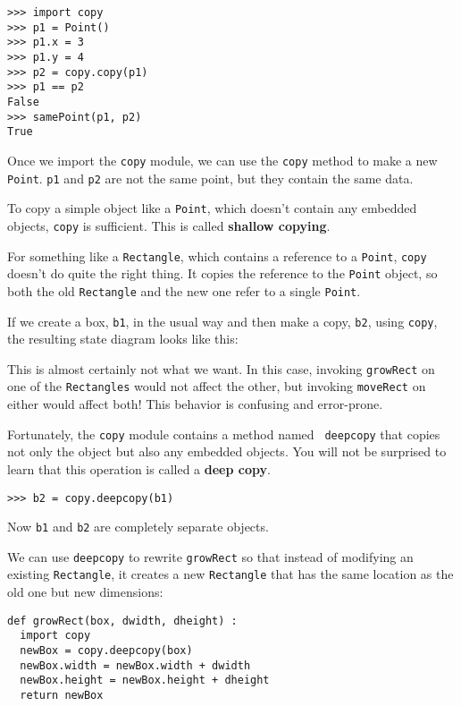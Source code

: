 \beforeverb
\begin{verbatim}
>>> import copy
>>> p1 = Point()
>>> p1.x = 3
>>> p1.y = 4
>>> p2 = copy.copy(p1)
>>> p1 == p2
False
>>> samePoint(p1, p2)
True
\end{verbatim}
\afterverb
%
Once we import the {\tt copy} module, we can use the {\tt copy} method
to make a new {\tt Point}.  {\tt p1} and {\tt p2} are not the
same point, but they contain the same data.

To copy a simple object like a {\tt Point}, which doesn't
contain any embedded objects, {\tt copy} is sufficient.  This is called 
{\bf shallow copying}.

For something like a {\tt Rectangle}, which contains a reference
to a {\tt Point}, {\tt copy} doesn't do quite the right thing.  It
copies the reference to the {\tt Point} object, so both the old
{\tt Rectangle} and the new one refer to a single {\tt Point}.


If we create a box, {\tt b1}, in the usual way and then make
a copy, {\tt b2}, using {\tt copy}, the resulting
state diagram looks like this:

\vspace{0.1in}
\beforefig
\centerline{}
\afterfig
\vspace{0.1in}

This is almost certainly not what we want.  In this case, invoking
{\tt growRect} on one of the {\tt Rectangles} would not affect
the other, but invoking {\tt moveRect} on either would affect both!
This behavior is confusing and error-prone.

Fortunately, the {\tt copy} module contains a method named {\tt
deepcopy} that copies not only the object but also any embedded
objects.  You will not be surprised to learn that this operation is
called a {\bf deep copy}.

\beforeverb
\begin{verbatim}
>>> b2 = copy.deepcopy(b1)
\end{verbatim}
\afterverb
%
Now {\tt b1} and {\tt b2} are completely separate objects.

We can use {\tt deepcopy} to rewrite {\tt growRect} so that
instead of modifying an existing {\tt Rectangle}, it creates a new
{\tt Rectangle} that has the same location as the old one but new
dimensions:

\beforeverb
\begin{verbatim}
def growRect(box, dwidth, dheight) :
  import copy
  newBox = copy.deepcopy(box)
  newBox.width = newBox.width + dwidth
  newBox.height = newBox.height + dheight
  return newBox
\end{verbatim}
\afterverb
%

